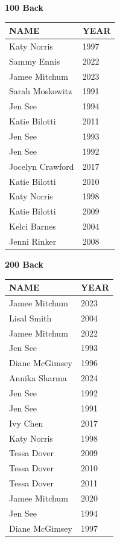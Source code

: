 \begin{table}[H]
\centering
\begin{minipage}[t]{0.48\textwidth}
\centering
\textbf{100 Back}\\[0.1cm]
\begin{tabular}{@{}p{2.8cm}p{1.2cm}@{}}
\hline
    \textbf{NAME} & \textbf{YEAR} \\
\hline
    Katy Norris & 1997 \\
    Sammy Ennis & 2022 \\
    Jamee Mitchum & 2023 \\
    Sarah Moskowitz & 1991 \\
    Jen See & 1994 \\
    Katie Bilotti & 2011 \\
    Jen See & 1993 \\
    Jen See & 1992 \\
    Jocelyn Crawford & 2017 \\
    Katie Bilotti & 2010 \\
    Katy Norris & 1998 \\
    Katie Bilotti & 2009 \\
    Kelci Barnes & 2004 \\
    Jenni Rinker & 2008 \\
\hline
\end{tabular}
\end{minipage}\hfill
\begin{minipage}[t]{0.48\textwidth}
\centering
\textbf{200 Back}\\[0.1cm]
\begin{tabular}{@{}p{2.8cm}p{1.2cm}@{}}
\hline
    \textbf{NAME} & \textbf{YEAR} \\
\hline
    Jamee Mitchum & 2023 \\
    Lisal Smith & 2004 \\
    Jamee Mitchum & 2022 \\
    Jen See & 1993 \\
    Diane McGimsey & 1996 \\
    Annika Sharma & 2024 \\
    Jen See & 1992 \\
    Jen See & 1991 \\
    Ivy Chen & 2017 \\
    Katy Norris & 1998 \\
    Tessa Dover & 2009 \\
    Tessa Dover & 2010 \\
    Tessa Dover & 2011 \\
    Jamee Mitchum & 2020 \\
    Jen See & 1994 \\
    Diane McGimsey & 1997 \\
\hline
\end{tabular}
\end{minipage}
\end{table}

